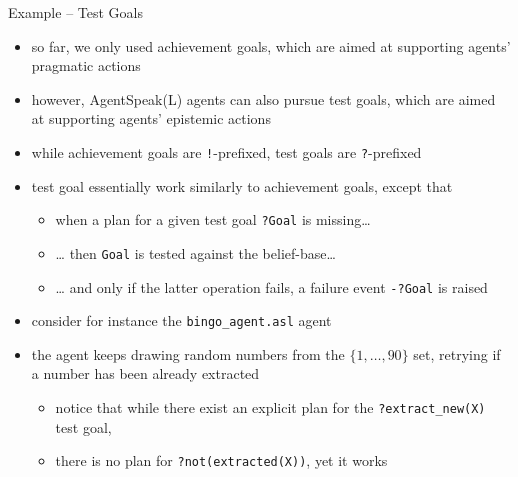 \documentclass[presentation]{beamer}\mode<presentation>{\usetheme{AMSBolognaFC}}
\begin{document}
\begin{frame}[c, allowframebreaks]{Example \theJasonExample{} -- Test Goals}
    \begin{itemize}
        \item so far, we only used \alert{achievement} goals, which are aimed at supporting agents' pragmatic actions
        
        \vspace{.3cm}
        
        \item however, AgentSpeak(L) agents can also pursue \alert{test} goals, which are aimed at supporting agents' epistemic actions
        
        \vspace{.3cm}
        
        \item while achievement goals are \texttt{!}-prefixed, test goals are \texttt{?}-prefixed
        
        \vspace{.3cm}
        
        \item test goal essentially work similarly to achievement goals, except that
        \begin{itemize}
            \item when a plan for a given test goal \texttt{?Goal} is missing\ldots{}
            \item \ldots{} then \texttt{Goal} is tested against the belief-base\ldots{}
            \item \ldots{} and only if the latter operation fails, a failure event \texttt{-?Goal} is raised
        \end{itemize}
        
        \framebreak
        
        \item consider for instance the \texttt{bingo\_agent.asl} agent
        
        
        \vspace{.3cm}
        
        \item the agent keeps drawing random numbers from the $\{1, \ldots, 90 \}$ set, retrying if a number has been already extracted
        \begin{itemize}
            \item notice that while there exist an explicit plan for the \texttt{?extract\_new(X)} test goal,
            \item there is no plan for \texttt{?not(extracted(X))}, yet it works
        \end{itemize}
    

\end{itemize}
\end{frame}
\end{document}
